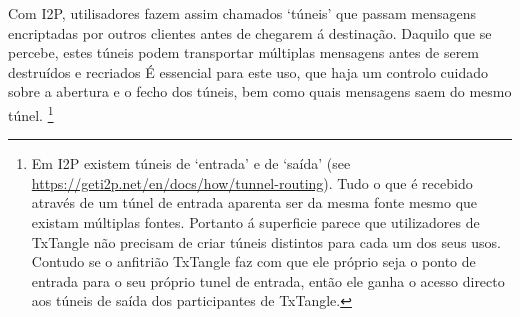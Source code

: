 Com I2P, utilisadores fazem assim chamados `túneis' que passam mensagens encriptadas por outros clientes antes de chegarem á destinação. Daquilo que se percebe, estes túneis podem transportar múltiplas mensagens antes de serem destruídos e recriados  
É essencial para este uso, que haja um controlo cuidado sobre a abertura e o fecho dos túneis, bem como quais mensagens saem do mesmo túnel.
\footnote{Em I2P existem túneis de `entrada' e de `saída' (see \url{https://geti2p.net/en/docs/how/tunnel-routing}). Tudo o que é recebido através de um túnel de entrada aparenta ser da mesma fonte mesmo que existam múltiplas fontes. Portanto á superficie parece que utilizadores de TxTangle não precisam de criar túneis distintos para cada um dos seus usos. Contudo se o anfitrião TxTangle faz com que ele próprio seja o ponto de entrada para o seu próprio tunel de entrada, então ele ganha o acesso directo aos túneis de saída dos participantes de TxTangle.}
